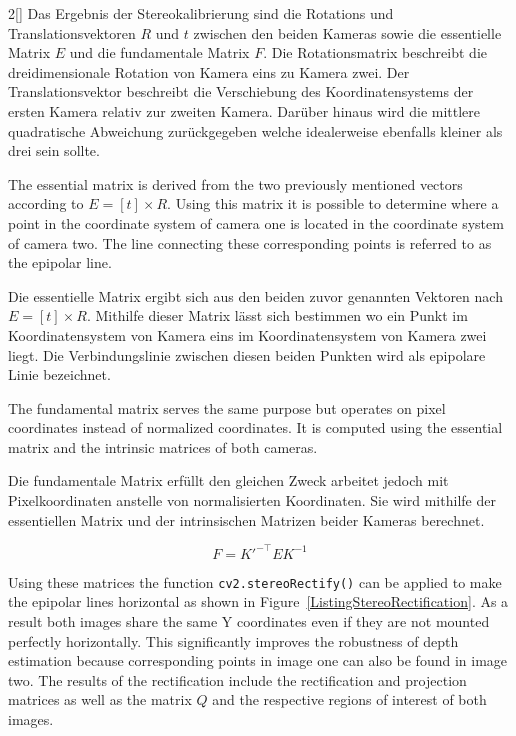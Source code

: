 \begin{paracol}{2}[]
Das Ergebnis der Stereokalibrierung sind die Rotations und Translationsvektoren $R$ und $t$ zwischen den beiden Kameras sowie die essentielle Matrix $E$ und die fundamentale Matrix $F$. Die Rotationsmatrix beschreibt die dreidimensionale Rotation von Kamera eins zu Kamera zwei. Der Translationsvektor beschreibt die Verschiebung des Koordinatensystems der ersten Kamera relativ zur zweiten Kamera. Darüber hinaus wird die mittlere quadratische Abweichung zurückgegeben welche idealerweise ebenfalls kleiner als drei sein sollte.

\coleng

The essential matrix is derived from the two previously mentioned vectors according to $E = [t] \times R$. Using this matrix it is possible to determine where a point in the coordinate system of camera one is located in the coordinate system of camera two. The line connecting these corresponding points is referred to as the epipolar line.

\colger

Die essentielle Matrix ergibt sich aus den beiden zuvor genannten Vektoren nach $E = [t] \times R$. Mithilfe dieser Matrix lässt sich bestimmen wo ein Punkt im Koordinatensystem von Kamera eins im Koordinatensystem von Kamera zwei liegt. Die Verbindungslinie zwischen diesen beiden Punkten wird als epipolare Linie bezeichnet.

\coleng

The fundamental matrix serves the same purpose but operates on pixel coordinates instead of normalized coordinates. It is computed using the essential matrix and the intrinsic matrices of both cameras.

\colger

Die fundamentale Matrix erfüllt den gleichen Zweck arbeitet jedoch mit Pixelkoordinaten anstelle von normalisierten Koordinaten. Sie wird mithilfe der essentiellen Matrix und der intrinsischen Matrizen beider Kameras berechnet.

\colende

$$ F = K'^{-\top} E K^{-1} $$ 

\colstart

Using these matrices the function \texttt{cv2.stereoRectify()} can be applied to make the epipolar lines horizontal as shown in Figure~\ref{ListingStereoRectification}. As a result both images share the same Y coordinates even if they are not mounted perfectly horizontally. This significantly improves the robustness of depth estimation because corresponding points in image one can also be found in image two. The results of the rectification include the rectification and projection matrices as well as the matrix $Q$ and the respective regions of interest of both images.


\end{paracol}
